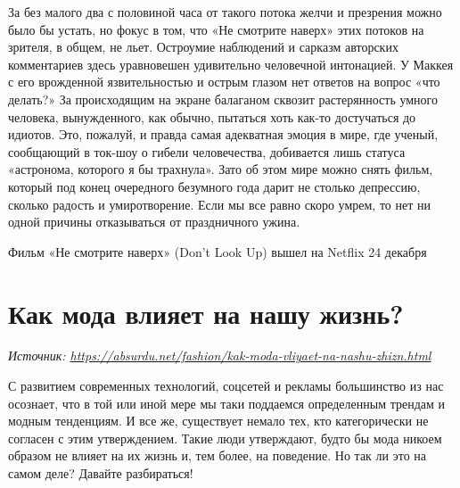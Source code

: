 За без малого два с половиной часа от такого потока желчи и презрения можно было бы устать, но фокус в том, что «Не смотрите наверх» этих потоков на зрителя, в общем, не льет. Остроумие наблюдений и сарказм авторских комментариев здесь уравновешен удивительно человечной интонацией. У Маккея с его врожденной язвительностью и острым глазом нет ответов на вопрос «что делать?» За происходящим на экране балаганом сквозит растерянность умного человека, вынужденного, как обычно, пытаться хоть как-то достучаться до идиотов. Это, пожалуй, и правда самая адекватная эмоция в мире, где ученый, сообщающий в ток-шоу о гибели человечества, добивается лишь статуса «астронома, которого я бы трахнула». Зато об этом мире можно снять фильм, который под конец очередного безумного года дарит не столько депрессию, сколько радость и умиротворение. Если мы все равно скоро умрем, то нет ни одной причины отказываться от праздничного ужина.

Фильм «Не смотрите наверх» (Don't Look Up) вышел на Netflix 24 декабря

\clearpage


\section{Как мода влияет на нашу жизнь?}

\textit{Источник: \url{https://absurdu.net/fashion/kak-moda-vliyaet-na-nashu-zhizn.html}}

С развитием современных технологий, соцсетей и рекламы большинство из нас осознает, что в той или иной мере мы таки поддаемся определенным трендам и модным тенденциям. И все же, существует немало тех, кто категорически не согласен с этим утверждением. Такие люди утверждают, будто бы мода никоем образом не влияет на их жизнь и, тем более, на поведение. Но так ли это на самом деле? Давайте разбираться!

